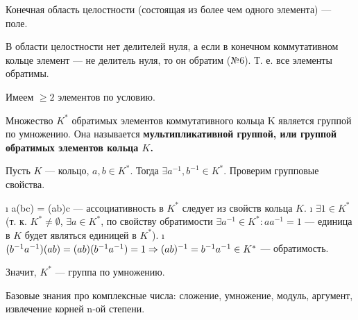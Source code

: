 \begin{problem}[7]
Конечная область целостности (состоящая из более чем одного элемента) --- поле.
\end{problem}

\begin{solution}
В области целостности нет делителей нуля, а если в конечном коммутативном кольце элемент --- не делитель нуля, то он обратим (№6). Т. е. все элементы обратимы.

Имеем \(\ge 2\) элементов по условию.
\end{solution}

\begin{problem}[8]
Множество $K^*$ обратимых элементов коммутативного кольца K является группой по умножению. Она называется \bf{мультипликативной группой}, или \bf{группой обратимых элементов} кольца $K$.
\end{problem}

\begin{solution}
Пусть \(K\) --- кольцо, \(a, b \in K^*\). Тогда \(\exists a^{-1}, b^{-1} \in K^*\). Проверим групповые свойства.

\begin{enumerate}
\def\labelenumi{\arabic{enumi}.}
\tightlist
\i
  a(bc) = (ab)c --- ассоциативность в \(K^*\) следует из свойств кольца \(K\).
\i
  \(\exists 1 \in K^*\) (т. к. \(K^* \ne \emptyset\), \(\exists a \in K^*\), по свойству обратимости \(\exists a^{-1} \in K^*: aa^{-1} = 1\) --- единица в \(K\) будет являться единицей в \(K^*\)).
\i
  \((b^{-1}a^{-1})(ab) = (ab)(b^{-1}a^{-1})=1 \Rightarrow (ab)^{-1} = b^{-1} a^{-1} \in K^*\) --- обратимость.
\end{enumerate}

Значит, \(K^*\) --- группа по умножению.
\end{solution}

\begin{problem}[9(1.5-1.7)]
Базовые знания про комплексные числа: сложение, умножение, модуль, аргумент, извлечение корней n-ой степени.
\end{problem}

